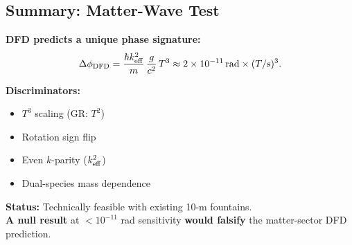 \subsection{Summary: Matter-Wave Test}\label{sec:mw-summary}

\begin{tcolorbox}[colback=green!5!white, colframe=green!50!black, title=Key Result: Matter-Wave $T^3$ Test]
\textbf{DFD predicts a unique phase signature:}
\begin{equation*}
\Delta\phi_{\rm DFD} = \frac{\hbar k_{\rm eff}^2}{m}\,\frac{g}{c^2}\,T^3 \approx 2 \times 10^{-11}\,\text{rad}\times(T/\text{s})^3.
\end{equation*}

\textbf{Discriminators:}
\begin{itemize}
\item $T^3$ scaling (GR: $T^2$)
\item Rotation sign flip
\item Even $k$-parity ($k_{\rm eff}^2$)
\item Dual-species mass dependence
\end{itemize}

\textbf{Status:} Technically feasible with existing 10-m fountains.
\\
\textbf{A null result} at $<10^{-11}$ rad sensitivity \textbf{would falsify} the matter-sector DFD prediction.
\end{tcolorbox}
